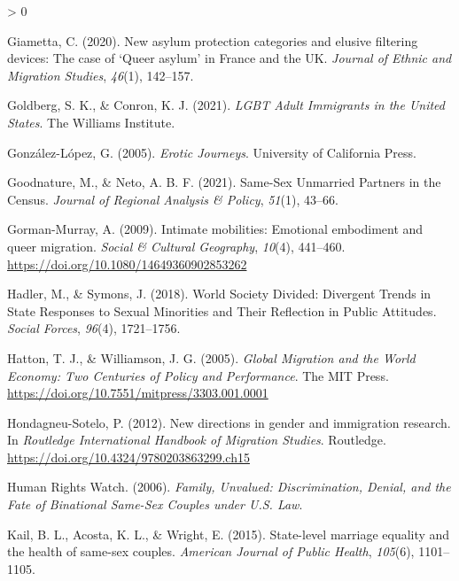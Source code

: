 \documentclass[
  11pt,
]{article}
\newlength{\cslhangindent}
\newenvironment{CSLReferences}[2] %
 {%
  \setlength{\parindent}{0pt}
  \ifodd #1 \everypar{\setlength{\hangindent}{\cslhangindent}}\ignorespaces\fi
  \ifnum #2 > 0
  \setlength{\parskip}{#2\baselineskip}
  \fi
 }%
 {}
\begin{document}
\begin{CSLReferences}{1}{0}
\leavevmode\hypertarget{ref-giametta_2020}{}%
Giametta, C. (2020). New asylum protection categories and elusive filtering devices: The case of {`{Queer} asylum'} in {France} and the {UK}. \emph{Journal of Ethnic and Migration Studies}, \emph{46}(1), 142--157.

\leavevmode\hypertarget{ref-goldberg_2021}{}%
Goldberg, S. K., \& Conron, K. J. (2021). \emph{{LGBT Adult Immigrants} in the {United States}}. {The Williams Institute}.

\leavevmode\hypertarget{ref-gonzalez-lopez_2005}{}%
González-López, G. (2005). \emph{Erotic {Journeys}}. {University of California Press}.

\leavevmode\hypertarget{ref-goodnature_2021}{}%
Goodnature, M., \& Neto, A. B. F. (2021). Same-{Sex Unmarried Partners} in the {Census}. \emph{Journal of Regional Analysis \& Policy}, \emph{51}(1), 43--66.

\leavevmode\hypertarget{ref-gorman-murray_2009}{}%
Gorman-Murray, A. (2009). Intimate mobilities: Emotional embodiment and queer migration. \emph{Social \& Cultural Geography}, \emph{10}(4), 441--460. \url{https://doi.org/10.1080/14649360902853262}

\leavevmode\hypertarget{ref-hadler_2018_world}{}%
Hadler, M., \& Symons, J. (2018). World {Society Divided}: {Divergent Trends} in {State Responses} to {Sexual Minorities} and {Their Reflection} in {Public Attitudes}. \emph{Social Forces}, \emph{96}(4), 1721--1756.

\leavevmode\hypertarget{ref-hatton_2005a}{}%
Hatton, T. J., \& Williamson, J. G. (2005). \emph{Global {Migration} and the {World Economy}: {Two Centuries} of {Policy} and {Performance}}. {The MIT Press}. \url{https://doi.org/10.7551/mitpress/3303.001.0001}

\leavevmode\hypertarget{ref-hondagneu-sotelo_2012}{}%
Hondagneu-Sotelo, P. (2012). New directions in gender and immigration research. In \emph{Routledge {International Handbook} of {Migration Studies}}. {Routledge}. \url{https://doi.org/10.4324/9780203863299.ch15}

\leavevmode\hypertarget{ref-humanrightswatch_2006}{}%
Human Rights Watch. (2006). \emph{Family, {Unvalued}: {Discrimination}, {Denial}, and the {Fate} of {Binational Same}-{Sex Couples} under {U}.{S}. {Law}}.

\leavevmode\hypertarget{ref-kail_2015}{}%
Kail, B. L., Acosta, K. L., \& Wright, E. (2015). State-level marriage equality and the health of same-sex couples. \emph{American Journal of Public Health}, \emph{105}(6), 1101--1105.


\end{CSLReferences}
\end{document}
